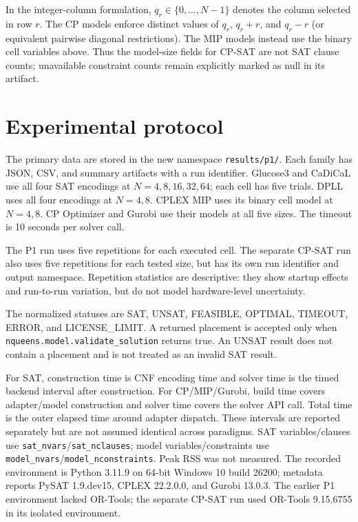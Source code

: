 \documentclass[a4paper,fleqn]{cas-sc}
\begin{document}
In the integer-column formulation, $q_r\in\{0,\ldots,N-1\}$ denotes the
column selected in row $r$. The CP models enforce distinct values of $q_r$,
$q_r+r$, and $q_r-r$ (or equivalent pairwise diagonal restrictions). The MIP
models instead use the binary cell variables above. Thus the model-size fields
for CP-SAT are not SAT clause counts; unavailable constraint counts remain
explicitly marked as null in its artifact.

\section{Experimental protocol}
The primary data are stored in the new namespace \texttt{results/p1/}. Each
family has JSON, CSV, and summary artifacts with a run identifier. Glucose3
and CaDiCaL use all four SAT encodings at $N=4,8,16,32,64$; each cell has five
trials. DPLL uses all four encodings at $N=4,8$. CPLEX MIP uses its binary
cell model at $N=4,8$. CP Optimizer and Gurobi use their models at all five
sizes. The timeout is 10 seconds per solver call.

The P1 run uses five repetitions for each executed cell. The separate CP-SAT
run also uses five repetitions for each tested size, but has its own run
identifier and output namespace. Repetition statistics are descriptive: they
show startup effects and run-to-run variation, but do not model hardware-level
uncertainty.

The normalized statuses are SAT, UNSAT, FEASIBLE, OPTIMAL, TIMEOUT, ERROR,
and LICENSE\_LIMIT. A returned placement is accepted only when
\texttt{nqueens.model.validate\_solution} returns true. An UNSAT result does
not contain a placement and is not treated as an invalid SAT result.

For SAT, construction time is CNF encoding time and solver time is the timed
backend interval after construction. For CP/MIP/Gurobi, build time covers
adapter/model construction and solver time covers the solver API call. Total
time is the outer elapsed time around adapter dispatch. These intervals are
reported separately but are not assumed identical across paradigms. SAT
variables/clauses use \texttt{sat\_nvars}/\texttt{sat\_nclauses}; model
variables/constraints use \texttt{model\_nvars}/\texttt{model\_nconstraints}.
Peak RSS was not measured. The recorded environment is Python 3.11.9 on
64-bit Windows 10 build 26200; metadata reports PySAT 1.9.dev15, CPLEX
22.2.0.0, and Gurobi 13.0.3. The earlier P1 environment lacked OR-Tools;
the separate CP-SAT run used OR-Tools 9.15.6755 in its isolated environment.
\end{document}
